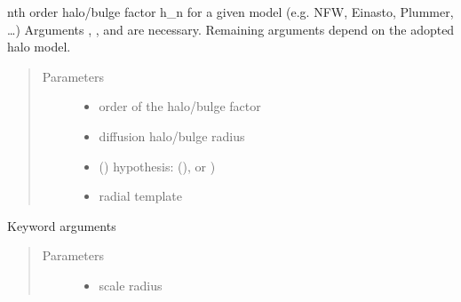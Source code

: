 \documentclass[letterpaper,10pt,english]{sphinxmanual}
\begin{document}
\begin{fulllineitems}
\label{\detokenize{diffsph.profiles:diffsph.profiles.hfactors.halo_factor}}
\sphinxAtStartPar
n\sphinxhyphen{}th order halo/bulge factor h\_n for a given model (e.g. NFW, Einasto, Plummer, …) 
Arguments , ,  and  are necessary. Remaining arguments depend on the 
adopted halo model.
\begin{quote}\begin{description}
\item[{Parameters}] \leavevmode\begin{itemize}
\item {} 
\sphinxAtStartPar
{} \textendash{} order of the halo/bulge factor

\item {} 
\sphinxAtStartPar
{} \textendash{} diffusion halo/bulge radius

\item {} 
\sphinxAtStartPar
{} () \textendash{} hypothesis:  (),  or )

\item {} 
\sphinxAtStartPar
{} \textendash{} radial template

\end{itemize}

\end{description}\end{quote}

\sphinxAtStartPar
Keyword arguments
\begin{quote}\begin{description}
\item[{Parameters}] \leavevmode\begin{itemize}
\item {} 
\sphinxAtStartPar
{} \textendash{} scale radius


\end{itemize}
\end{description}
\end{quote}
\end{fulllineitems}
\end{document}
